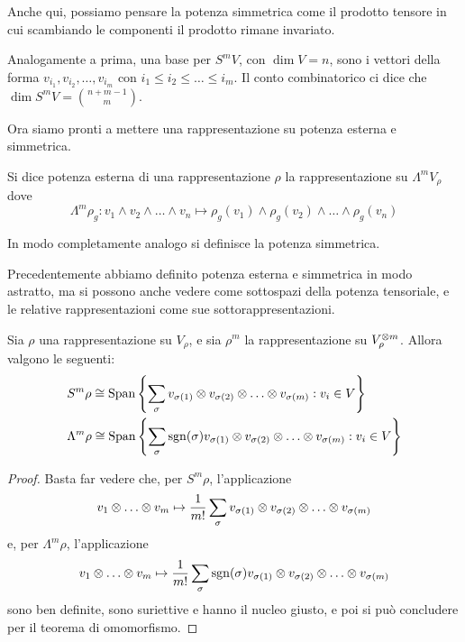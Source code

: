 Anche qui, possiamo pensare la potenza simmetrica come il prodotto tensore in cui scambiando le componenti il prodotto rimane invariato.

Analogamente a prima, una base per $S^mV$, con $\dim V=n$, sono i vettori della forma  $v_{i_1},v_{i_2},\dots,v_{i_m}$ con $i_1\le i_2\le \dots \le i_m$. Il conto combinatorico ci dice che $\dim S^mV = \binom{n+m-1}m$.

Ora siamo pronti a mettere una rappresentazione su potenza esterna e simmetrica.



\begin{mydef}
  Si dice potenza esterna di una rappresentazione $\rho$ la rappresentazione su $\Lambda^m V_\rho$ dove
  \[
  \Lambda^m\rho_g: v_1 \wedge v_2 \wedge \dots \wedge v_n \mapsto \rho_g(v_1) \wedge \rho_g(v_2) \wedge \dots \wedge \rho_g(v_n)
  \]
  
  In modo completamente analogo si definisce la potenza simmetrica.

\end{mydef}

Precedentemente abbiamo definito potenza esterna e simmetrica in modo astratto, ma si possono anche vedere come sottospazi della potenza tensoriale, e le relative rappresentazioni come sue sottorappresentazioni.

\begin{myprop}
  Sia $\rho$ una rappresentazione su $V_\rho$, e sia $\rho^m$ la rappresentazione su $V_\rho^{\otimes m}$. Allora valgono le seguenti: 
  \begin{eqnarray*}
  &S^m\rho \isom \Span{\left\{\sum_\sigma v_{\sigma(1)}\tensor v_{\sigma(2)} \tensor \dots \tensor v_{\sigma(m)}:v_i \in V\right\}}\\
  &\Lambda^m\rho \isom \Span{\left\{\sum_\sigma \sgn(\sigma) v_{\sigma(1)}\tensor v_{\sigma(2)} \tensor \dots \tensor v_{\sigma(m)}:v_i \in V\right\}} 
  \end{eqnarray*}

\end{myprop}

\begin{proof}
  Basta far vedere che, per $S^m\rho$, l'applicazione
  \[
  v_1 \tensor \dots \tensor v_m \mapsto \frac1{m!} \sum_\sigma v_{\sigma(1)}\tensor v_{\sigma(2)} \tensor \dots \tensor v_{\sigma(m)}
  \]
  e, per $\Lambda^m\rho$, l'applicazione
  \[
  v_1 \tensor \dots \tensor v_m \mapsto \frac1{m!} \sum_\sigma \sgn(\sigma) v_{\sigma(1)}\tensor v_{\sigma(2)} \tensor \dots \tensor v_{\sigma(m)}
  \] sono ben definite, sono suriettive e hanno il nucleo giusto, e poi si può concludere per il teorema di omomorfismo. 
\end{proof}

